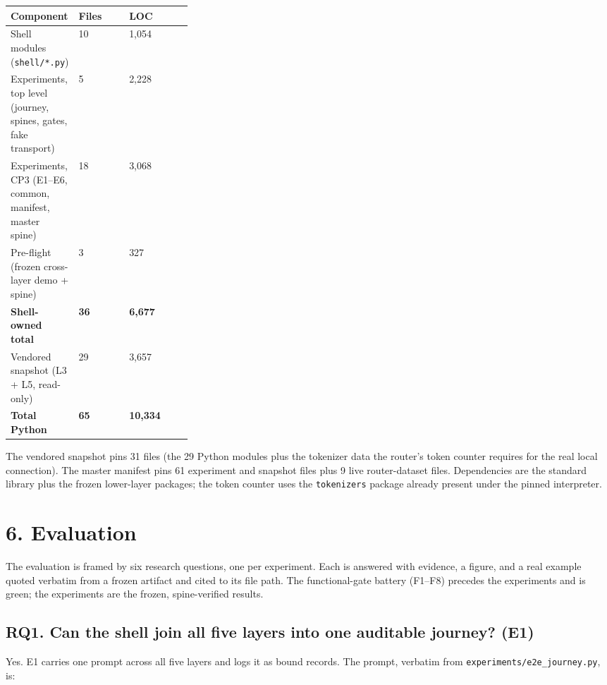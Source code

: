 \documentclass[11pt,a4paper]{article}
\begin{document}
\begin{table}[htbp]\centering\small
\begin{tabularx}{\linewidth}{@{}>{\raggedright\arraybackslash}p{0.30\linewidth}XX@{}}
\toprule
Component & Files & LOC \\
\midrule
Shell modules (\texttt{shell/*.py}) & 10 & 1,054 \\
Experiments, top level (journey, spines, gates, fake transport) & 5 & 2,228 \\
Experiments, CP3 (E1--E6, common, manifest, master spine) & 18 & 3,068 \\
Pre-flight (frozen cross-layer demo + spine) & 3 & 327 \\
\textbf{Shell-owned total} & \textbf{36} & \textbf{6,677} \\
Vendored snapshot (L3 + L5, read-only) & 29 & 3,657 \\
\textbf{Total Python} & \textbf{65} & \textbf{10,334} \\
\bottomrule
\end{tabularx}
\end{table}
The vendored snapshot pins 31 files (the 29 Python modules plus the tokenizer data the router's token counter requires for the real local connection). The master manifest pins 61 experiment and snapshot files plus 9 live router-dataset files. Dependencies are the standard library plus the frozen lower-layer packages; the token counter uses the \texttt{tokenizers} package already present under the pinned interpreter.

\section*{6. Evaluation}
The evaluation is framed by six research questions, one per experiment. Each is answered with evidence, a figure, and a real example quoted verbatim from a frozen artifact and cited to its file path. The functional-gate battery (F1--F8) precedes the experiments and is green; the experiments are the frozen, spine-verified results.

\subsection*{RQ1. Can the shell join all five layers into one auditable journey? (E1)}
Yes. E1 carries one prompt across all five layers and logs it as bound records. The prompt, verbatim from \texttt{experiments/e2e\_journey.py}, is:
\end{document}
